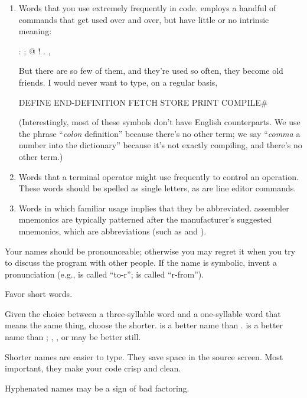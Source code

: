 \begin{enumerate}
\item Words that you use extremely frequently in code. \Forth{}
employs a handful of commands that get used over and over, but have
little or no intrinsic meaning:
\begin{Code}
:   ;   @   !   .   ,
\end{Code}
But there are so few of them, and they're used so often, they become
old friends.  I would never want to type, on a regular basis,
\begin{Code}
DEFINE   END-DEFINITION   FETCH   STORE
     PRINT   COMPILE#
\end{Code}
(Interestingly, most of these symbols don't have English counterparts.
We use the phrase ``\emph{colon} definition'' because there's no other
term; we say ``\emph{comma} a number into the dictionary'' because
it's not exactly compiling, and there's no other term.)
\item Words that a terminal operator might use frequently to control
an operation.  These words should be spelled as single letters, as are
line editor commands.
\item Words in which familiar usage implies that they be abbreviated.
\Forth{} assembler mnemonics are typically patterned after the
manufacturer's suggested mnemonics, which are abbreviations (such as
 and ).
\end{enumerate}%
Your names should be pronounceable; otherwise you may regret it when
you try to discuss the program with other people.  If the name is
symbolic, invent a pronunciation (e.g.,  is called ``to-r'';
 is called ``r-from'').

\begin{tip}
Favor short words.
\end{tip}
Given the choice between a three-syllable word and a one-syllable word
that means the same thing, choose the shorter.   is a
better name than .   is a better name
than ; , , or  may be
better still.

Shorter names are easier to type.  They save space in the source
screen.  Most important, they make your code crisp and clean.

%
\begin{tip}
Hyphenated names may be a sign of bad factoring.
\end{tip}%

